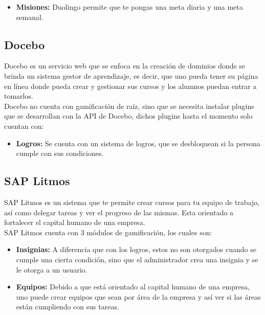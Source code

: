 \begin{multicols*}{2}
\begin{itemize}
    \item {\bf Misiones:} Duolingo permite que te pongas una meta diaria y una meta semanal.

    \end{itemize}


\subsection*{Docebo}
    
 Docebo es un servicio web que se enfoca en la creación de dominios donde se brinda
 un sistema gestor de aprendizaje, es decir, que uno pueda tener su página en línea
 donde pueda crear y gestionar sus cursos y los alumnos puedan entrar a tomarlos.\\
    
 \noindent Docebo no cuenta con gamificación de raíz, sino que se necesita instalar
 plugins que se desarrollan con la API de Docebo, dichos plugins hasta el momento 
 solo cuentan con:

    \begin{itemize}
        \item {\bf Logros:} Se cuenta con un sistema de logros,
        que se desbloquean si la persona cumple con sus condiciones.
    \end{itemize}
    
    
    
\subsection*{SAP Litmos}
    
 SAP Litmos es un sistema que te permite crear cursos para tu equipo de trabajo,
 así como delegar tareas y ver el progreso de las mismas. Esta orientado a
 fortalecer el capital humano de una empresa.\\
    
    \noindent SAP Litmos cuenta con 3 módulos de gamificación, los cuales son:
    
    \begin{itemize}
        \item {\bf Insignias:} A diferencia que con los logros, estos
        no son otorgados cuando se cumple una cierta condición, sino 
        que el administrador crea una insignia y se le otorga a un usuario.
        
        \item {\bf Equipos: } Debido a que está orientado al capital humano
         de una empresa, uno puede crear equipos que sean por área de la
          empresa y así ver si las áreas están cumpliendo con sus tareas.
          

\end{itemize}
\end{multicols*}

